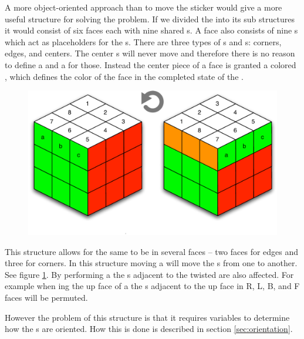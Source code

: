 A more object-oriented approach than to move the sticker would give a more useful structure for solving the problem.
If we divided the \rubik{} into its sub structures it would consist of six faces each with nine shared \cubie{}s.
A face also consists of nine \cubicle{}s which act as placeholders for the \cpiece{}s. 
There are three types of \cpiece{}s and \cubicle{}s: corners, edges, and centers. 
The center \cpiece{}s will never move and therefore there is no reason to define a \cubicle{} and a \cpiece{} for those. Instead the center piece of a face is granted a colored \facelet{}, which defines the color of the face in the completed state of the \rubik{}.
\begin{figure}[h]
	\centering
		\includegraphics[scale=0.5]{input/pics/twistOfUpFace}
	\caption{}
	\label{fig:twistOfUpFace}
\end{figure}
This structure allows for the same \cubicle{} to be in several faces -- two faces for edges and three for corners. 
In this structure moving a \face{} will move the \cpiece{}s from one \cubicle{} to another. See figure \ref{fig:twistOfUpFace}. By performing a \twist{} the \face{}s adjacent to the twisted \face{} are also affected. 
For example when \twist{}ing the up face of a \rubik{} the \cubie{}s adjacent to the up face in R, L, B, and F faces will be permuted.

However the problem of this structure is that it requires variables to determine how the \cubie{}s are oriented. 
How this is done is described in section \ref{sec:orientation}.

	
	
	